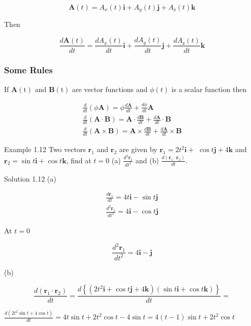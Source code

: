 \documentclass[10pt]{article}
\numberwithin{equation}{section}
\begin{document}
$$
\mathbf{A}(t)=A_{x}(t) \mathbf{i}+A_{y}(t) \mathbf{j}+A_{\mathrm{z}}(t) \mathbf{k}
$$

Then

$$
\frac{d \mathbf{A}(t)}{d t}=\frac{d A_{x}(t)}{d t} \mathbf{i}+\frac{d A_{y}(t)}{d t} \mathbf{j}+\frac{d A_{\mathrm{z}}(t)}{d t} \mathbf{k}
$$

\subsubsection{Some Rules}\label{sec:1-9-1}
If $\mathbf{A}(\mathrm{t})$ and $\mathbf{B}(\mathrm{t})$ are vector functions and $\phi(t)$ is a scalar function then

$$
\begin{gathered}
\frac{d}{d t}(\phi \mathbf{A})=\phi \frac{d \mathbf{A}}{d t}+\frac{d \phi}{d t} \mathbf{A} \\
\frac{d}{d t}(\mathbf{A} \cdot \mathbf{B})=\mathbf{A} \cdot \frac{d \mathbf{B}}{d t}+\frac{d \mathbf{A}}{d t} \cdot \mathbf{B} \\
\frac{d}{d t}(\mathbf{A} \times \mathbf{B})=\mathbf{A} \times \frac{d \mathbf{B}}{d t}+\frac{d \mathbf{A}}{d t} \times \mathbf{B}
\end{gathered}
$$

Example 1.12 Two vectors $\mathbf{r}_{1}$ and $\mathbf{r}_{2}$ are given by $\mathbf{r}_{1}=2 t^{2} \mathbf{i}+$ $\cos t \mathbf{j}+4 \mathbf{k}$ and $\mathbf{r}_{2}=\sin t \mathbf{i}+\cos t \mathbf{k}$, find at $t=0$ (a) $\frac{d^{2} \mathbf{r}_{1}}{d t^{2}}$ and (b) $\frac{d\left(\mathbf{r}_{1} \cdot \mathbf{r}_{2}\right)}{d t}$.

Solution 1.12 (a)

$$
\begin{gathered}
\frac{d \mathbf{r}_{1}}{d t}=4 t \mathbf{i}-\sin t \mathbf{j} \\
\frac{d^{2} \mathbf{r}_{1}}{d t^{2}}=4 \mathbf{i}-\cos t \mathbf{j}
\end{gathered}
$$

At $t=0$

$$
\frac{d^{2} \mathbf{r}_{1}}{d t^{2}}=4 \mathbf{i}-\mathbf{j}
$$

(b)

$$
\frac{d\left(\mathbf{r}_{1} \cdot \mathbf{r}_{2}\right)}{d t}=\frac{d\left\{\left(2 t^{2} \mathbf{i}+\cos t \mathbf{j}+4 \mathbf{k}\right)(\sin t \mathbf{i}+\cos t \mathbf{k})\right\}}{d t}=
$$

$\frac{d\left(2 t^{2} \sin t+4 \cos t\right)}{d t}=4 t \sin t+2 t^{2} \cos t-4 \sin t=4(t-1) \sin t+2 t^{2} \cos t$
\end{document}
